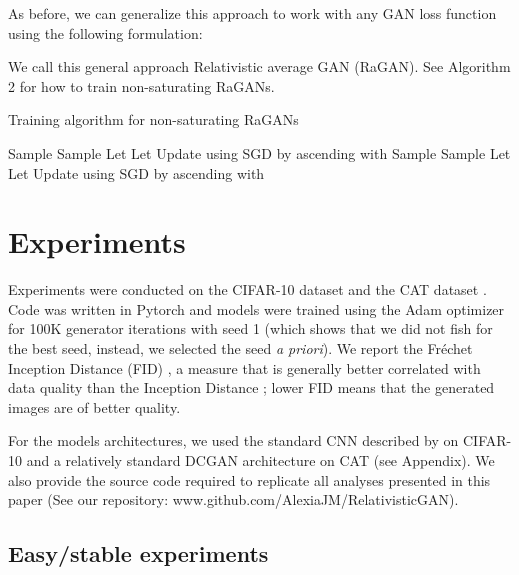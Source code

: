 \documentclass{article}
\begin{document}
As before, we can generalize this approach to work with any GAN loss function using the following formulation:


We call this general approach Relativistic average GAN (RaGAN). See Algorithm 2 for how to train non-saturating RaGANs.

\begin{algorithm}  
	\caption{Training algorithm for non-saturating RaGANs
		\label{alg:1}}
	\begin{algorithmic}
		\For{}
		\State Sample 
		\State Sample 
		\State Let 
		\State Let 
		\State Update  using SGD by ascending with 
		\State \quad 
		\EndFor 
		\State Sample 
		\State Sample 
		\State Let 
		\State Let 
		\State Update  using SGD by ascending with 
		\State \quad 
		\EndWhile
	\end{algorithmic}
\end{algorithm}

\section{Experiments}

Experiments were conducted on the CIFAR-10 dataset \citep{krizhevsky2009learning} and the CAT dataset \citep{cat}. Code was written in Pytorch \citep{pytorch} and models were trained using the Adam optimizer \citep{Adam} for 100K generator iterations with seed 1 (which shows that we did not fish for the best seed, instead, we selected the seed \textit{a priori}). We report the Fréchet Inception Distance (FID) \citep{heusel2017gans}, a measure that is generally better correlated with data quality than the Inception Distance \citep{tricks} \citep{borji2018pros}; lower FID means that the generated images are of better quality. 

For the models architectures, we used the standard CNN described by \citet{miyato2018spectral} on CIFAR-10 and a relatively standard DCGAN architecture \citep{DCGAN} on CAT (see Appendix). We also provide the source code required to replicate all analyses presented in this paper (See our repository: www.github.com/AlexiaJM/RelativisticGAN).

\subsection{Easy/stable experiments}
\end{document}
